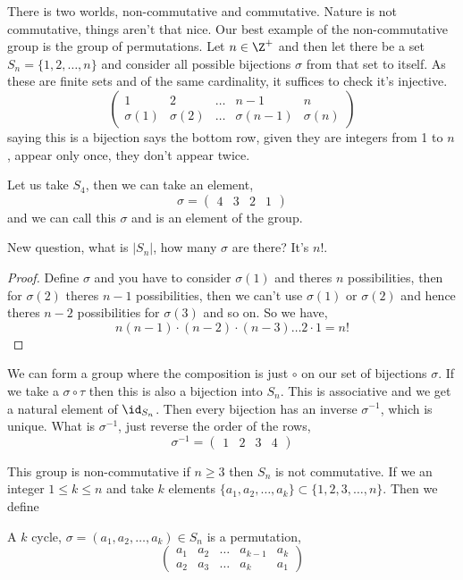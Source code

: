 There is two worlds, non-commutative and commutative. Nature is not commutative, things aren't that nice. Our best example of the non-commutative group is the group of permutations. Let $n \in \Z^+$ and then let there be a set $S_n = \{1, 2, \dots, n\}$ and consider all possible bijections $\sigma$ from that set to itself. As these are finite sets and of the same cardinality, it suffices to check it's injective.
$$ \begin{pmatrix}
  1 & 2 & \dots & n-1 & n\\
  \sigma(1) & \sigma(2) & \dots & \sigma(n-1) & \sigma(n)
\end{pmatrix} $$
saying this is a bijection says the bottom row, given they are integers from 1 to $n$, appear only once, they don't appear twice.

\begin{eg}
  Let us take $S_4$, then we can take an element,
  $$ \sigma = \begin{pmatrix}
    4 & 3 & 2 & 1
  \end{pmatrix} $$
  and we can call this $\sigma$ and is an element of the group.
\end{eg}

New question, what is $|S_n|$, how many $\sigma$ are there? It's $n!$.

\begin{proof}
  Define $\sigma$ and you have to consider $\sigma(1)$ and theres $n$ possibilities, then for $\sigma(2)$ theres $n-1$ possibilities, then we can't use $\sigma(1)$ or $\sigma(2)$ and hence theres $n - 2$ possibilities for $\sigma(3)$ and so on. So we have,
  $$ n (n - 1) \cdot (n - 2) \cdot (n - 3) \dots 2 \cdot 1 = n! $$
\end{proof}

We can form a group where the composition is just $\circ$ on our set of bijections $\sigma$. If we take a $\sigma \circ \tau$ then this is also a bijection into $S_n$. This is associative and we get a natural element of $\id_{S_n}$. Then every bijection has an inverse $\sigma^{-1}$, which is unique. What is $\sigma^{-1}$, just reverse the order of the rows,
$$ \sigma^{-1} = \begin{pmatrix}
  1 & 2 & 3 & 4
\end{pmatrix} $$

This group is non-commutative if $n \ge 3$ then $S_n$ is not commutative. If we an integer $1 \le k \le n$ and take $k$ elements $\{a_1, a_2, \dots, a_k\} \subset \{1, 2, 3, \dots, n\}$. Then we define
\begin{ndefi}[k-cycle]
  A $k$ cycle, $\sigma = (a_1, a_2, \dots, a_k) \in S_n$  is a permutation,
  $$ \begin{pmatrix}
    a_1 & a_2 & \dots & a_{k-1} & a_k \\
    a_2 & a_3 & \dots & a_k & a_1
  \end{pmatrix} $$
\end{ndefi}

